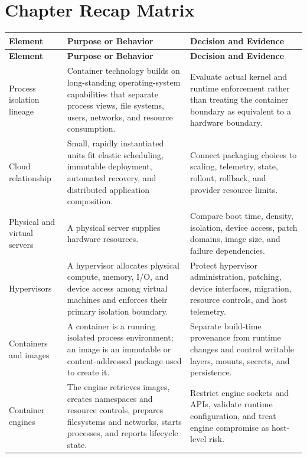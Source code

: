 \documentclass[11pt]{article}
\begin{document}
\section{Chapter Recap Matrix}
\begingroup\small\setlength{\tabcolsep}{4pt}
\begin{longtable}{@{}>{\RaggedRight\arraybackslash}p{}>{\RaggedRight\arraybackslash}p{}>{\RaggedRight\arraybackslash}p{}@{}}
\toprule\rowcolor{Navy}\color{white}\textbf{Element} & \color{white}\textbf{Purpose or Behavior} & \color{white}\textbf{Decision and Evidence}\\\midrule\endfirsthead
\toprule\rowcolor{Navy}\color{white}\textbf{Element} & \color{white}\textbf{Purpose or Behavior} & \color{white}\textbf{Decision and Evidence}\\\midrule\endhead
Process isolation lineage & Container technology builds on long-standing operating-system capabilities that separate process views, file systems, users, networks, and resource consumption. & Evaluate actual kernel and runtime enforcement rather than treating the container boundary as equivalent to a hardware boundary. \\\midrule
Cloud relationship & Small, rapidly instantiated units fit elastic scheduling, immutable deployment, automated recovery, and distributed application composition. & Connect packaging choices to scaling, telemetry, state, rollout, rollback, and provider resource limits. \\\midrule
Physical and virtual servers & A physical server supplies hardware resources. & Compare boot time, density, isolation, device access, patch domains, image size, and failure dependencies. \\\midrule
Hypervisors & A hypervisor allocates physical compute, memory, I/O, and device access among virtual machines and enforces their primary isolation boundary. & Protect hypervisor administration, patching, device interfaces, migration, resource controls, and host telemetry. \\\midrule
Containers and images & A container is a running isolated process environment; an image is an immutable or content-addressed package used to create it. & Separate build-time provenance from runtime changes and control writable layers, mounts, secrets, and persistence. \\\midrule
Container engines & The engine retrieves images, creates namespaces and resource controls, prepares filesystems and networks, starts processes, and reports lifecycle state. & Restrict engine sockets and APIs, validate runtime configuration, and treat engine compromise as host-level risk. \\\midrule

\end{longtable}
\end{document}
